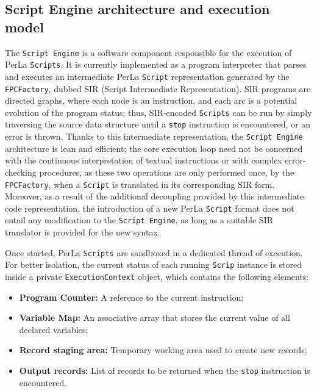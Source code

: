 \subsection{Script Engine architecture and execution model}

The \texttt{Script Engine} is a software component responsible for the
execution of PerLa \texttt{Scripts}. It is currently implemented as a program
interpreter that parses and executes an intermediate PerLa \texttt{Script}
representation generated by the \texttt{FPCFactory}, dubbed SIR (Script
Intermediate Representation). SIR programs are directed graphs, where each node
is an instruction, and each arc is a potential evolution of the program status;
thus, SIR-encoded \texttt{Scripts} can be run by simply traversing the source
data structure until a \texttt{stop} instruction is encountered, or an error is
thrown. Thanks to this intermediate representation, the \texttt{Script Engine}
architecture is lean and efficient; the core execution loop need not be
concerned with the continuous interpretation of textual instructions or with
complex error-checking procedures, as these two operations are only performed
once, by the \texttt{FPCFactory}, when a \texttt{Script} is translated in its
corresponding SIR form. Moreover, as a result of the additional decoupling
provided by this intermediate code representation, the introduction of a new
PerLa \texttt{Script} format does not entail any modification to the
\texttt{Script Engine}, as long as a suitable SIR translator is provided for
the new syntax.

Once started, PerLa \texttt{Scripts} are sandboxed in a dedicated thread of
execution. For better isolation, the current status of each running
\texttt{Scrip} instance is stored inside a private \texttt{ExecutionContext}
object, which contains the following elements:

\begin{itemize}

    \item \textbf{Program Counter:} A reference to the current instruction;

    \item \textbf{Variable Map:} An associative array that stores the current
        value of all declared variables;

    \item \textbf{Record staging area:} Temporary working area used to create
        new records;

    \item \textbf{Output records:} List of records to be returned when the
        \texttt{stop} instruction is encountered. 

\end{itemize}

